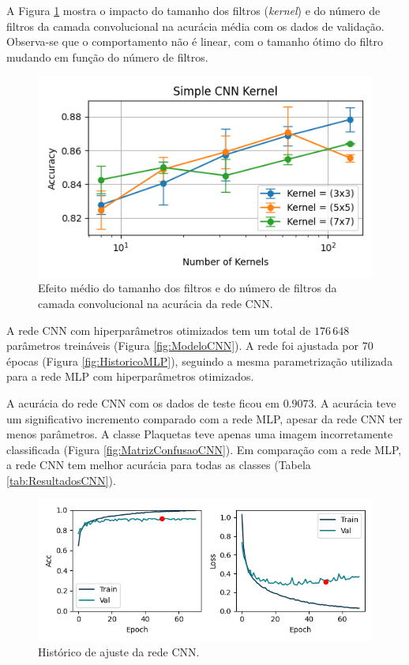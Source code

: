 \documentclass[final,5p]{elsarticle}
\numberwithin{equation}{section}
\begin{document}
    A Figura \ref{fig:KernelCNN} mostra o impacto do tamanho dos filtros (\emph{kernel}) e do número de filtros da camada convolucional na acurácia média com os dados de validação. Observa-se que o comportamento não é linear, com o tamanho ótimo do filtro mudando em função do número de filtros.

     \begin{figure}[hbt!]
         \includegraphics[width=0.95\columnwidth]{CNN_kernel.png}
         \caption{Efeito médio do tamanho dos filtros e do número de filtros da camada convolucional na acurácia da rede CNN.}\label{fig:KernelCNN}
     \end{figure}

     A rede CNN com hiperparâmetros otimizados tem um total de $176\,648$ parâmetros treináveis (Figura \ref{fig:ModeloCNN}). A rede foi ajustada por 70 épocas (Figura \ref{fig:HistoricoMLP}), seguindo a mesma parametrização utilizada para a rede MLP com hiperparâmetros otimizados.

     A acurácia do rede CNN com os dados de teste ficou em $0.9073$. A acurácia teve um significativo incremento comparado com a rede MLP, apesar da rede CNN ter menos parâmetros. A classe Plaquetas teve apenas uma imagem incorretamente classificada (Figura \ref{fig:MatrizConfusaoCNN}). Em comparação com a rede MLP, a rede CNN tem melhor acurácia para todas as classes (Tabela \ref{tab:ResultadosCNN}).

    \begin{figure}[hbt!]
        \includegraphics[width=0.95\columnwidth]{CNN_Simple_history_cropped.png}
        \caption{Histórico de ajuste da rede CNN.}\label{fig:HistoricoCNN}
    \end{figure}
\end{document}
